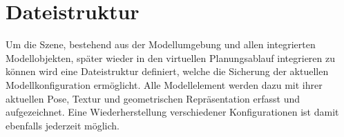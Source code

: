 \section{Dateistruktur}
Um die Szene, bestehend aus der Modellumgebung und allen integrierten Modellobjekten, später wieder in den virtuellen Planungsablauf integrieren zu können wird eine Dateistruktur definiert, welche die Sicherung der aktuellen Modellkonfiguration ermöglicht. Alle Modellelement werden dazu mit ihrer aktuellen Pose, Textur und geometrischen Repräsentation erfasst und aufgezeichnet. Eine Wiederherstellung verschiedener Konfigurationen ist damit ebenfalls jederzeit möglich.\\

